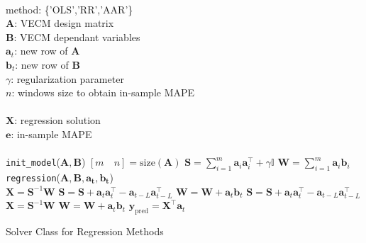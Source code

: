 \documentclass[twocolumn]{svjour3}          %
\begin{document}
\begin{algorithm}[ht]
\begin{algorithmic}[1]
\REQUIRE $\,$ \\
method: \{'OLS','RR','AAR'\} \\
$\mathbf{A}$: VECM design matrix \\
$\mathbf{B}$: VECM dependant variables \\
$\mathbf{a}_t$: new row of $\mathbf{A}$ \\
$\mathbf{b}_t$: new row of $\mathbf{B}$ \\
$\gamma$: regularization parameter \\
$n$: windows size to obtain in-sample MAPE \\
\ENSURE  $\,$ \\
$\mathbf{X}$: regression solution \\
$\mathbf{e}$: in-sample MAPE \\
\quad \\
\texttt{init\_model}($\mathbf{A},\mathbf{B}$)
\STATE $ [m \quad n] = \text{size}(\mathbf{A}) $ 
\STATE $\mathbf{S} = \displaystyle \sum_{i=1}^m \mathbf{a}_i \mathbf{a}_i^\top + \gamma \mathbb{I}$
\STATE $\mathbf{W} = \displaystyle \sum_{i=1}^m \mathbf{a}_i \mathbf{b}_i$
\quad \\
\texttt{regression}($\mathbf{A},\mathbf{B},\mathbf{a_t},\mathbf{b_t}$) \\
        \STATE $\mathbf{X} = \mathbf{S}^{-1} \mathbf{W} $
        \STATE $\mathbf{S} = \mathbf{S}+
        \mathbf{a}_t \mathbf{a}_t^\top-
        \mathbf{a}_{t-L} \mathbf{a}_{t-L}^\top$
        \STATE $\mathbf{W} = \mathbf{W} + \mathbf{a}_t \mathbf{b}_t$
        \STATE $\mathbf{S} = \mathbf{S}+
        \mathbf{a}_t \mathbf{a}_t^\top-
        \mathbf{a}_{t-L} \mathbf{a}_{t-L}^\top$
        \STATE $\mathbf{X} = \mathbf{S}^{-1} \mathbf{W} $
        \STATE $\mathbf{W} = \mathbf{W} + \mathbf{a}_t \mathbf{b}_t$
\ENDIF
\STATE $\mathbf{y}_{\text{pred}} = \mathbf{X}^\top \mathbf{a}_t$
\end{algorithmic}
\caption{Solver Class for Regression Methods}
\label{alg:solver}
\end{algorithm}
\end{document}
